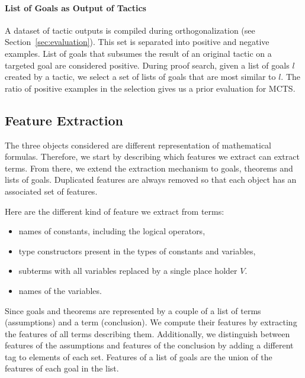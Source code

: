 \documentclass[runningheads,a4paper,draft]{svjour3}
\begin{document}
\paragraph{List of Goals as Output of Tactics}
A dataset of tactic outputs is compiled during orthogonalization (see 
Section~\ref{sec:evaluation}).
This set is separated into positive and negative examples.
List of goals that subsumes the result of an original tactic on a 
targeted goal are considered positive. During proof search, given a list of 
goals $l$ created by a tactic, we select a set of lists of goals that are most 
similar to $l$. The ratio of positive examples in the selection gives us a 
prior evaluation for MCTS.


\subsection{Feature Extraction}\label{sec:features}
The three objects considered are different representation of mathematical 
formulas. Therefore, we start by describing which features we extract can 
extract terms. From there, we extend the extraction mechanism 
to goals, theorems and lists of goals. Duplicated features are always removed 
so that each object has an associated set of features.


Here are the different kind of feature we extract from terms:
\begin{itemize}
\item names of constants, including the logical operators,
\item type constructors present in the types of constants and variables,
\item subterms with all variables replaced by a single place holder $V$.
\item names of the variables.
\end{itemize}

Since goals and theorems are represented by a couple of a list of terms 
(assumptions) and a term (conclusion). We compute their features by extracting 
the features of all terms describing them. Additionally, we distinguish between 
features of the assumptions and features of the conclusion by adding a 
different tag to elements of each set. Features of a list of goals are
the union of the features of each goal in the list. 
\end{document}
